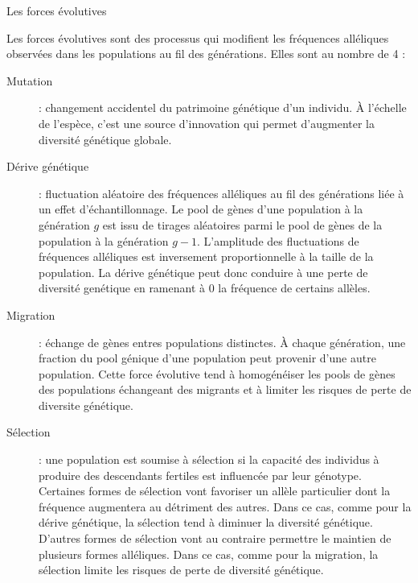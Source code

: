\documentclass[a4paper,12pt,twoside]{article}\usepackage[]{graphicx}\usepackage[]{color}
\begin{document}
\begin {bibunit} [newbst]
\begin{enca}[htb]
\caption{Les forces évolutives}\label{Forces}
\onehalfspacing
	Les forces évolutives sont des processus qui modifient les fréquences alléliques observées dans les populations au fil des générations. Elles sont au nombre de 4 :
\begin{description}
	\item[Mutation] : changement accidentel du patrimoine génétique d'un individu. À l'échelle de l'espèce, c'est une source d'innovation qui permet d'augmenter la diversité génétique globale.
	\item[Dérive génétique] : fluctuation aléatoire des fréquences alléliques au fil des générations liée à un effet d'échantillonnage. Le pool de gènes d'une population à la génération $g$ est issu de tirages aléatoires parmi le pool de gènes de la population à la génération $g-1$. L'amplitude des fluctuations de fréquences alléliques est inversement proportionnelle à la taille de la population. La dérive génétique peut donc conduire à une perte de diversité genétique en ramenant à 0 la fréquence de certains allèles.
	\item[Migration] : échange de gènes entres populations distinctes. À chaque génération, une fraction du pool génique d'une population peut provenir d'une autre population. Cette force évolutive tend à homogénéiser les pools de gènes des populations échangeant des migrants et à limiter les risques de perte de diversite génétique.
	\item[Sélection] : une population est soumise à sélection si la capacité des individus à produire des descendants fertiles est influencée par leur génotype. Certaines formes de sélection vont favoriser un allèle particulier dont la fréquence augmentera au détriment des autres. Dans ce cas, comme pour la dérive génétique, la sélection tend à diminuer la diversité génétique. D'autres formes de sélection vont au contraire permettre le maintien de plusieurs formes alléliques. Dans ce cas, comme pour la migration, la sélection limite les risques de perte de diversité génétique.
\end{description}
\end{enca}


\end{bibunit}
\end{document}
